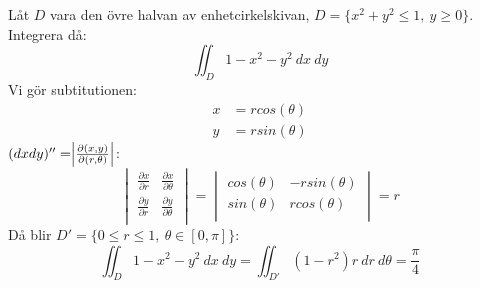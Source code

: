 \documentclass{report}
\begin{document}
{
	Låt $ D $ vara den övre halvan av enhetcirkelskivan, $ D = \{ x^2+y^2  \le 1, \: y \ge 0 \} $. Integrera då:
\begin{equation*}
\iint_{D}^{} 1-x^2-y^2 \: dx   \: dy 
\end{equation*}
Vi gör subtitutionen:
\begin{align*}
	x &= rcos( \theta )\\
	y &= rsin( \theta )
\end{align*}
$ (dxdy)'' = \Bigr| \frac{\partial(x,y)}{\partial(r, \theta)}  \Bigl| $:
\begin{equation*}
\begin{vmatrix}
	\frac{\partial x }{\partial  r}  & \frac{\partial x }{\partial \theta }   \\
	\frac{\partial y }{\partial r }  & \frac{\partial y }{\partial \theta }  \\
\end{vmatrix}
=
\begin{vmatrix}
	cos(\theta) & -rsin(\theta) \\
	sin(\theta) & rcos(\theta) \\
\end{vmatrix}
= r
\end{equation*}
Då blir $ D' = \{0 \le r \le 1, \: \theta \in [0, \pi]\}$:
\begin{equation*}
\iint_{D}^{} 1-x^2-y^2 \: dx   \: dy = \iint_{D'}^{} (1-r^2)r \: dr   \: d\theta = \frac{\pi}{4} 
\end{equation*}
}
\end{document}
